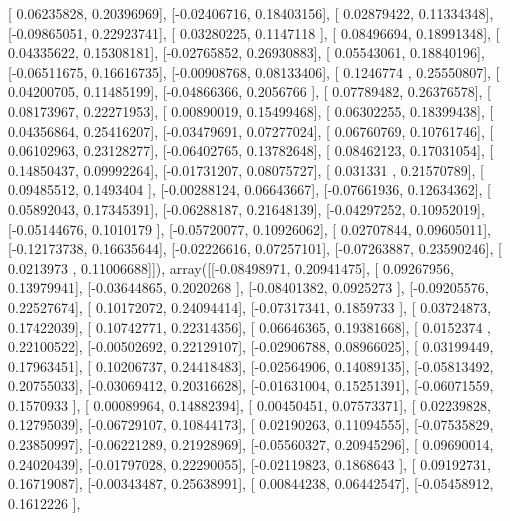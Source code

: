 \documentclass{article}
\begin{document}
       [ 0.06235828,  0.20396969],
       [-0.02406716,  0.18403156],
       [ 0.02879422,  0.11334348],
       [-0.09865051,  0.22923741],
       [ 0.03280225,  0.1147118 ],
       [ 0.08496694,  0.18991348],
       [ 0.04335622,  0.15308181],
       [-0.02765852,  0.26930883],
       [ 0.05543061,  0.18840196],
       [-0.06511675,  0.16616735],
       [-0.00908768,  0.08133406],
       [ 0.1246774 ,  0.25550807],
       [ 0.04200705,  0.11485199],
       [-0.04866366,  0.2056766 ],
       [ 0.07789482,  0.26376578],
       [ 0.08173967,  0.22271953],
       [ 0.00890019,  0.15499468],
       [ 0.06302255,  0.18399438],
       [ 0.04356864,  0.25416207],
       [-0.03479691,  0.07277024],
       [ 0.06760769,  0.10761746],
       [ 0.06102963,  0.23128277],
       [-0.06402765,  0.13782648],
       [ 0.08462123,  0.17031054],
       [ 0.14850437,  0.09992264],
       [-0.01731207,  0.08075727],
       [ 0.031331  ,  0.21570789],
       [ 0.09485512,  0.1493404 ],
       [-0.00288124,  0.06643667],
       [-0.07661936,  0.12634362],
       [ 0.05892043,  0.17345391],
       [-0.06288187,  0.21648139],
       [-0.04297252,  0.10952019],
       [-0.05144676,  0.1010179 ],
       [-0.05720077,  0.10926062],
       [ 0.02707844,  0.09605011],
       [-0.12173738,  0.16635644],
       [-0.02226616,  0.07257101],
       [-0.07263887,  0.23590246],
       [ 0.0213973 ,  0.11006688]]), array([[-0.08498971,  0.20941475],
       [ 0.09267956,  0.13979941],
       [-0.03644865,  0.2020268 ],
       [-0.08401382,  0.0925273 ],
       [-0.09205576,  0.22527674],
       [ 0.10172072,  0.24094414],
       [-0.07317341,  0.1859733 ],
       [ 0.03724873,  0.17422039],
       [ 0.10742771,  0.22314356],
       [ 0.06646365,  0.19381668],
       [ 0.0152374 ,  0.22100522],
       [-0.00502692,  0.22129107],
       [-0.02906788,  0.08966025],
       [ 0.03199449,  0.17963451],
       [ 0.10206737,  0.24418483],
       [-0.02564906,  0.14089135],
       [-0.05813492,  0.20755033],
       [-0.03069412,  0.20316628],
       [-0.01631004,  0.15251391],
       [-0.06071559,  0.1570933 ],
       [ 0.00089964,  0.14882394],
       [ 0.00450451,  0.07573371],
       [ 0.02239828,  0.12795039],
       [-0.06729107,  0.10844173],
       [ 0.02190263,  0.11094555],
       [-0.07535829,  0.23850997],
       [-0.06221289,  0.21928969],
       [-0.05560327,  0.20945296],
       [ 0.09690014,  0.24020439],
       [-0.01797028,  0.22290055],
       [-0.02119823,  0.1868643 ],
       [ 0.09192731,  0.16719087],
       [-0.00343487,  0.25638991],
       [ 0.00844238,  0.06442547],
       [-0.05458912,  0.1612226 ],
\end{document}
